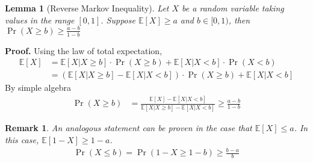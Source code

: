 \documentclass{article}
\newtheorem{definition}{Definition}
\newtheorem{thm}{Theorem}
\newtheorem{lem}[thm]{Lemma}
\newtheorem{remark}{Remark}
\begin{document}
\begin{lem}[Reverse Markov Inequality] \label{markovlemma}
Let $X$ be a random variable taking values in the range $[0,1]$. Suppose $\mathbb{E}[X]\geq a$ and $b\in [0,1)$, then $\Pr(X\geq b)\geq \frac{a-b}{1-b}$
\end{lem} \textbf{Proof.} Using the law of total expectation,
\begin{align} 
    \mathbb{E}[X] &= \mathbb{E}[X|X\geq b]\cdot \Pr(X\geq b) + \mathbb{E}[X|X < b]\cdot \Pr(X < b)\\
    &= (\mathbb{E}[X|X\geq b] - \mathbb{E}[X|X<b])\cdot \Pr(X\geq b) + \mathbb{E}[X|X<b]
\end{align} By simple algebra \begin{align}
    \Pr(X\geq b) &= \frac{\mathbb{E}[X] - \mathbb{E}[X|X<b]}{\mathbb{E}[X|X\geq b] - \mathbb{E}[X|X<b]} \geq \frac{a-b}{1-b}
\end{align}

\begin{remark}
An analogous statement can be proven in the case that $\mathbb{E}[X]\leq a$. In this case, $\mathbb{E}[1-X]\geq 1-a$.
\begin{align}
    \Pr(X\leq b) = \Pr(1-X\geq 1-b) \geq \frac{b-a}{b}
\end{align}
\end{remark}



\end{document}
